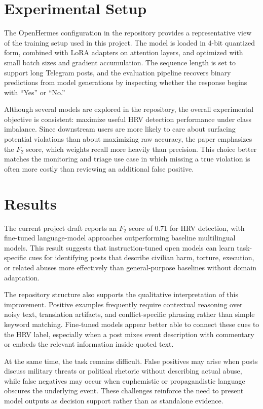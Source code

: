 \documentclass[letterpaper]{article}
\begin{document}
\section{Experimental Setup}
The OpenHermes configuration in the repository provides a representative view of the training setup used in this project. The model is loaded in 4-bit quantized form, combined with LoRA adapters on attention layers, and optimized with small batch sizes and gradient accumulation. The sequence length is set to support long Telegram posts, and the evaluation pipeline recovers binary predictions from model generations by inspecting whether the response begins with ``Yes'' or ``No.''

Although several models are explored in the repository, the overall experimental objective is consistent: maximize useful HRV detection performance under class imbalance. Since downstream users are more likely to care about surfacing potential violations than about maximizing raw accuracy, the paper emphasizes the $F_2$ score, which weights recall more heavily than precision. This choice better matches the monitoring and triage use case in which missing a true violation is often more costly than reviewing an additional false positive.

\section{Results}
The current project draft reports an $F_2$ score of 0.71 for HRV detection, with fine-tuned language-model approaches outperforming baseline multilingual models. This result suggests that instruction-tuned open models can learn task-specific cues for identifying posts that describe civilian harm, torture, execution, or related abuses more effectively than general-purpose baselines without domain adaptation.

The repository structure also supports the qualitative interpretation of this improvement. Positive examples frequently require contextual reasoning over noisy text, translation artifacts, and conflict-specific phrasing rather than simple keyword matching. Fine-tuned models appear better able to connect these cues to the HRV label, especially when a post mixes event description with commentary or embeds the relevant information inside quoted text.

At the same time, the task remains difficult. False positives may arise when posts discuss military threats or political rhetoric without describing actual abuse, while false negatives may occur when euphemistic or propagandistic language obscures the underlying event. These challenges reinforce the need to present model outputs as decision support rather than as standalone evidence.
\end{document}
